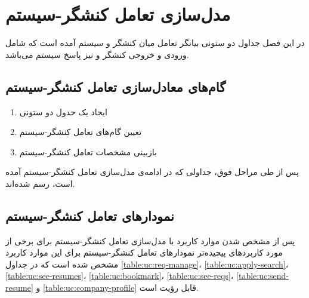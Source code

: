 \chapter{مدل‌سازی تعامل کنشگر-سیستم}
در این فصل جداول دو‌ ستونی بیانگر تعامل میان کنشگر و سیستم آمده است که شامل ورودی و خروجی کنشگر و نیز پاسخ سیستم می‌باشد.


\section{گام‌های معادل‌سازی تعامل کنشگر-سیستم}
\begin{enumerate}
	\item 
	ایجاد یک حدول دو ستونی
	
	\item 
	تعیین گام‌های تعامل کنشگر-سیستم
	
	\item 
	بازبینی مشخصات تعامل کنشگر-سیستم
\end{enumerate}

پس از طی مراحل فوق، جداولی که در ادامه‌ی مدل‌سازی تعامل کنشگر-سیستم آمده‌ است، رسم شده‌اند.

\section{نمودار‌های تعامل کنشگر-سیستم}\label{expandeds}
پس از مشخص شدن موارد کاربرد با مدل‌سازی تعامل کنشگر-سیستم برای برخی از مورد‌ کاربرد‌های پیچیده‌تر نمودار‌های تعامل کنشگر-سیستم برای این موارد کاربرد مشخص شده است که در جداول 
\ref{table:uc:req-manage}،
\ref{table:uc:apply-search}،
\ref{table:uc:see-resumes}،
\ref{table:uc:bookmark}،
\ref{table:uc:see-reqs}،
\ref{table:uc:send-resume} و
\ref{table:uc:company-profile}
قابل رؤیت است.

